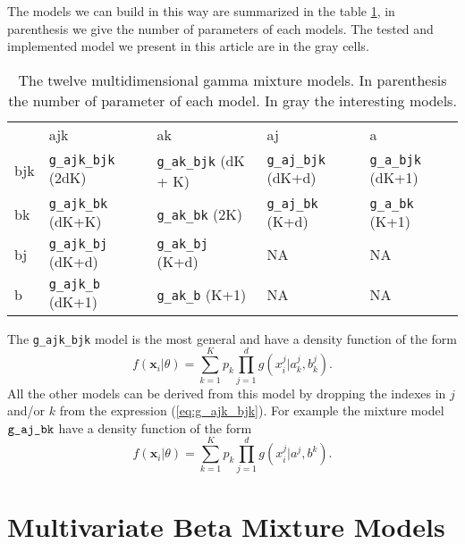 \documentclass[a4paper,10pt]{article}
\newcommand{\bx}{\mathbf{x}}
\begin{document}
The models we can build in this way are summarized in the table \ref{tab:gammamodels}, in parenthesis we give the number of
parameters of each models. The tested and implemented model we present in this article are in the gray cells.
\begin{table}
\begin{center}
\begin{tabular}{lllll}
           &  ajk                 &  ak          &  aj           &  a \\
bjk & {\color{gray} \verb+g_ajk_bjk+} (2dK)  & \verb+g_ak_bjk+ (dK + K)& {\color{gray} \verb+g_aj_bjk+} (dK+d) & \verb+g_a_bjk+ (dK+1)\\
bk  & {\color{gray} \verb+g_ajk_bk+}  (dK+K) & \verb+g_ak_bk+ (2K)     & {\color{gray} \verb+g_aj_bk+} (K+d) & \verb+g_a_bk+ (K+1) \\
bj  & {\color{gray} \verb+g_ajk_bj+}  (dK+d) & \verb+g_ak_bj+ (K+d)    & NA  & NA  \\
b   & {\color{gray} \verb+g_ajk_b+}   (dK+1) & \verb+g_ak_b+ (K+1)     & NA & NA \\
\end{tabular}
\end{center}
\caption{The twelve multidimensional gamma mixture models. In parenthesis the number of parameter of each model. In gray the
interesting models.}
\label{tab:gammamodels}
\end{table}

The \verb+g_ajk_bjk+ model is the most general and have a density function of the form
\begin{equation}\label{eq:g_ajk_bjk}
  f({\bx}_i|\theta) = \sum_{k=1}^K p_k \prod_{j=1}^d g(x^j_{i}| a^j_{k},b^j_{k}).
\end{equation}
All the other models can be derived from this model by dropping the indexes in $j$ and/or $k$
from the expression (\ref{eq:g_ajk_bjk}). For example the mixture model $\verb+g_aj_bk+$ have a density
function of the form
\begin{equation}\label{eq:g_aj_bk}
  f({\bx}_i|\theta) = \sum_{k=1}^K p_k \prod_{j=1}^d g(x^j_{i}| a^j,b^{k}).
\end{equation}

\section{Multivariate Beta Mixture Models}
\end{document}
